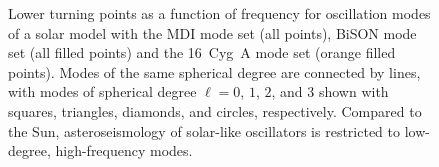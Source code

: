 \begin{figure}
    \centering
    \caption[Lower turning points of a solar model]{Lower turning points as a function of frequency for oscillation modes of a solar model with the MDI mode set (all points), BiSON mode set (all filled points) and the 16~Cyg~A mode set  (\textcolor{turn-orange}{orange} filled points). 
    Modes of the same spherical degree are connected by lines, with modes of spherical degree ${\ell = 0}$, $1$, $2$, and $3$ shown with squares, triangles, diamonds, and circles, respectively. Compared to the Sun, asteroseismology of solar-like oscillators is restricted to low-degree, high-frequency modes. 
    \label{fig:turning-points}} 
\end{figure}


